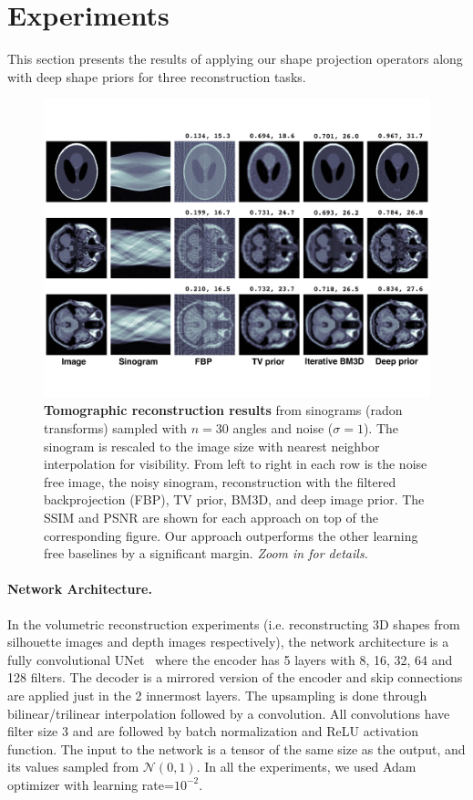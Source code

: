 \section{Experiments}
\label{sec:experiments}

This section presents the results of applying our shape projection operators along with deep shape priors for
three reconstruction tasks.

\begin{figure}
\centering
\includegraphics[width=\linewidth]{dsp/figs/CTcomparison-text.pdf}
\caption{\label{fig:ct} \textbf{Tomographic reconstruction
    results} from sinograms (radon transforms) sampled with $n = 30$
  angles and noise ($\sigma=1$). The sinogram is rescaled to the image
  size with nearest neighbor interpolation for visibility. From left
  to right in each row is the noise free image, the noisy sinogram,
  reconstruction with the filtered backprojection (FBP), TV prior,
  BM3D, and deep image prior. The SSIM and PSNR are shown for each
  approach on top of the corresponding figure. Our approach
  outperforms the other learning free baselines by a significant margin. \emph{Zoom in for details.}}
\end{figure}

\paragraph*{Network Architecture.}
In the volumetric reconstruction experiments (i.e. reconstructing 3D shapes from silhouette images and depth images respectively), the network architecture is a fully convolutional UNet~\cite{ronneberger2015u} where the encoder 
has 5 layers with 8, 16, 32, 64 and 128 filters.
The decoder is a mirrored version of the encoder and skip connections are applied just in the 2 innermost layers.
The upsampling is done through bilinear/trilinear interpolation followed by a convolution.
All convolutions have filter size 3 and are followed by batch normalization and ReLU activation function.
The input to the network is a tensor of the same size as the output, and its values sampled from $\mathcal{N}(0,1)$. In all the experiments, we used Adam optimizer with learning rate=$10^{-2}$.

